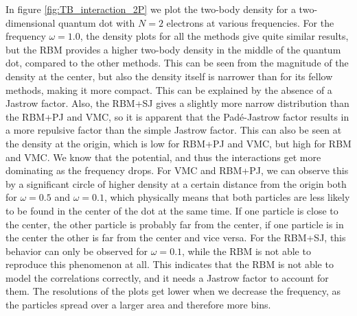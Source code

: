 In figure \eqref{fig:TB_interaction_2P} we plot the two-body density for a two-dimensional quantum dot with $N=2$ electrons at various frequencies. For the frequency $\omega=1.0$, the density plots for all the methods give quite similar results, but the RBM provides a higher two-body density in the middle of the quantum dot, compared to the other methods. This can be seen from the magnitude of the density at the center, but also the density itself is narrower than for its fellow methods, making it more compact. This can be explained by the absence of a Jastrow factor. Also, the RBM+SJ gives a slightly more narrow distribution than the RBM+PJ and VMC, so it is apparent that the Padé-Jastrow factor results in a more repulsive factor than the simple Jastrow factor. This can also be seen at the density at the origin, which is low for RBM+PJ and VMC, but high for RBM and VMC. We know that the potential, and thus the interactions get more dominating as the frequency drops. For VMC and RBM+PJ, we can observe this by a significant circle of higher density at a certain distance from the origin both for $\omega=0.5$ and $\omega=0.1$, which physically means that both particles are less likely to be found in the center of the dot at the same time. If one particle is close to the center, the other particle is probably far from the center, if one particle is in the center the other is far from the center and vice versa. For the RBM+SJ, this behavior can only be observed for $\omega=0.1$, while the RBM is not able to reproduce this phenomenon at all. This indicates that the RBM is not able to model the correlations correctly, and it needs a Jastrow factor to account for them. The resolutions of the plots get lower when we decrease the frequency, as the particles spread over a larger area and therefore more bins.

